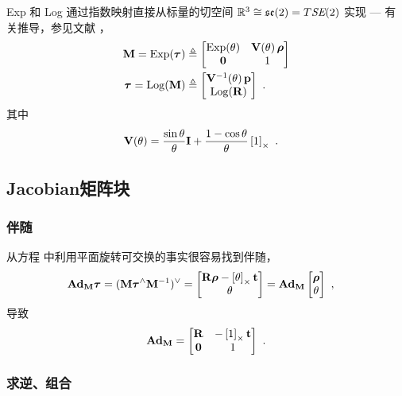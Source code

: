 Exp 和 Log 通过指数映射直接从标量的切空间 $\bbR^3\cong\se(2)=\mtan{\SE(2)}$ 实现 ---  有关推导，参见文献 \cite{EADE-Lie}，
%
\begin{align}
  \bfM = \Exp(\bftau) 
    &\te \begin{bmatrix}\Exp(\theta) & \bfV(\theta)\,\bfrho \\ \bf0 & 1  \end{bmatrix}  \label{equ:SE2_Exp} \\
  \bftau = \Log(\bfM) 
    &\te \begin{bmatrix} \bfV\inv(\theta)\, \bfp \\ \Log(\bfR) \end{bmatrix}~.
\end{align}
%
其中
%
\begin{align}
  \bfV(\theta)
  &= 
  \frac{\sin\theta}{\theta}\bfI + \frac{1-\cos\theta}{\theta}\hatx{1}
  ~.
\end{align}

\subsection{Jacobian矩阵块}
\label{sec:derivatives_SE2}

\subsubsection{伴随}

从方程  中利用平面旋转可交换的事实很容易找到伴随，
%
\begin{align*}
\Ad[\SE(2)]{\bfM} \bftau &= (\bfM \bftau^\wedge \bfM\inv)^\vee 
= \begin{bmatrix}
\bfR\bfrho-\hatx{\theta}\bft \\ \theta
\end{bmatrix} = \Ad[\SE(2)]{\bfM} \begin{bmatrix}
\bfrho\\\theta
\end{bmatrix}
~,
\end{align*}
%
导致
%
\begin{align}
\Ad[\SE(2)]{\bfM} = \begin{bmatrix}
\bfR & -\hatx{1}\bft \\ \bf0 & 1
\end{bmatrix}
~.
\end{align}


\subsubsection{求逆、组合}

